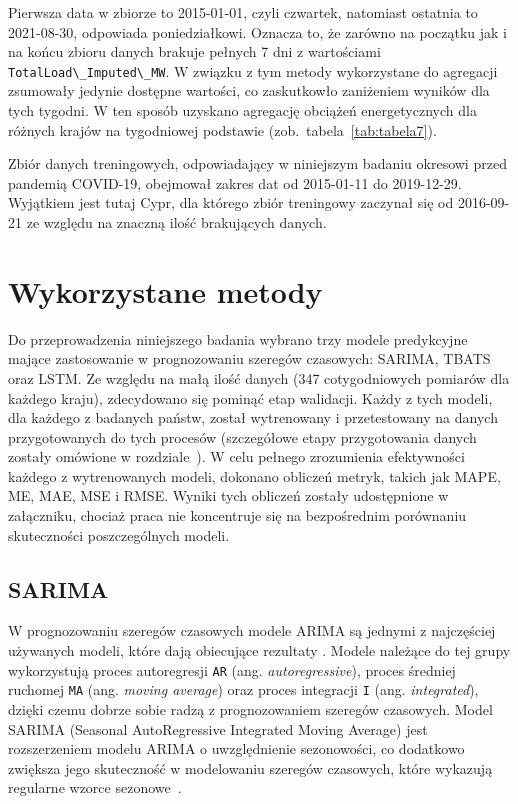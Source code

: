 \documentclass[polish, twoside, 12pt, a4paper]{article}
\theoremstyle{definition}
\theoremstyle{plain}
\theoremstyle{remark}
\newcommand{\code}[1]{\lstinline{#1}}
\begin{document}
Pierwsza data w zbiorze to 2015-01-01, czyli czwartek, natomiast ostatnia to 2021-08-30, odpowiada poniedziałkowi. Oznacza to, że zarówno na początku jak i na końcu zbioru danych brakuje pełnych 7 dni z wartościami \code{TotalLoad\_Imputed\_MW}. W związku z tym metody wykorzystane do agregacji zsumowały jedynie dostępne wartości, co zaskutkowło zaniżeniem wyników dla tych tygodni. W ten sposób uzyskano agregację obciążeń energetycznych dla różnych krajów na tygodniowej podstawie (zob.~tabela~\ref{tab:tabela7}). 

Zbiór danych treningowych, odpowiadający w niniejszym badaniu okresowi przed pandemią COVID-19, obejmował zakres dat od 2015-01-11 do 2019-12-29. Wyjątkiem jest tutaj Cypr, dla którego zbiór treningowy zaczynał się od 2016-09-21 ze względu na znaczną ilość brakujących danych. 

\clearpage
\section{Wykorzystane metody}\label{sec:metody}

Do przeprowadzenia niniejszego badania wybrano trzy modele predykcyjne mające zastosowanie w prognozowaniu szeregów czasowych: SARIMA, TBATS oraz LSTM. Ze względu na małą ilość danych (347 cotygodniowych pomiarów dla każdego kraju), zdecydowano się pominąć etap walidacji. Każdy z tych modeli, dla każdego z badanych państw, został wytrenowany i przetestowany na danych przygotowanych do tych procesów (szczegółowe etapy przygotowania danych zostały omówione w rozdziale~\textit{}). W celu pełnego zrozumienia efektywności każdego z wytrenowanych modeli, dokonano obliczeń metryk, takich jak MAPE, ME, MAE, MSE i RMSE. Wyniki tych obliczeń zostały udostępnione w załączniku, chociaż praca nie koncentruje się na bezpośrednim porównaniu skuteczności poszczególnych modeli.

\subsection{SARIMA}

W prognozowaniu szeregów czasowych modele ARIMA są jednymi z najczęściej używanych modeli, które dają obiecujące rezultaty \parencite{elsaraiti2021}. Modele należące do tej grupy wykorzystują proces autoregresji \code{AR} (ang. \textit{autoregressive}), proces średniej ruchomej \code{MA} (ang. \textit{moving average}) oraz proces integracji \code{I} (ang. \textit{integrated}), dzięki czemu dobrze sobie radzą z prognozowaniem szeregów czasowych. Model SARIMA (Seasonal AutoRegressive Integrated Moving Average) jest rozszerzeniem modelu ARIMA o uwzględnienie sezonowości, co dodatkowo zwiększa jego skuteczność w modelowaniu szeregów czasowych, które wykazują regularne wzorce sezonowe~\parencite{montgomery2011}. 
\end{document}
